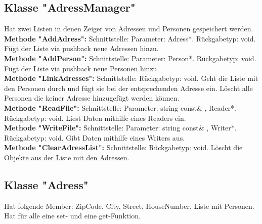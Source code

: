 \documentclass[12pt,a4paper]{article}
\begin{document}
\subsection {Klasse "AdressManager"}
Hat zwei Listen in denen Zeiger von Adressen und Personen gespeichert werden.
 \\

\textbf {Methode "AddAdress": } 
\newline
Schnittstelle: Parameter: Adress*. Rückgabetyp: void.
\newline 
Fügt der Liste via pushback neue Adressen hinzu.\\

\textbf {Methode "AddPerson": } 
\newline
Schnittstelle: Parameter: Person*. Rückgabetyp: void.
\newline
Fügt der Liste via pushback neue Personen hinzu. \\

\textbf {Methode "LinkAdresses": } 
\newline
Schnittstelle: Rückgabetyp: void.
\newline
 Geht die Liste mit den Personen durch und fügt sie bei der entsprechenden Adresse ein. Löscht alle Personen die keiner Adresse hinzugefügt werden können. \\

\textbf {Methode "ReadFile": } 
\newline
Schnittstelle: Parameter: string const\& , Reader*. Rückgabetyp: void.
\newline
Liest Daten mithilfe eines Readers ein.
\\

\textbf {Methode "WriteFile": } 
\newline
Schnittstelle: Parameter: string const\& , Writer*. Rückgabetyp: void.
\newline
Gibt Daten mithilfe eines Writers aus.
\\

\textbf {Methode "ClearAdressList": } 
\newline
Schnittstelle: Rückgabetyp: void.
\newline 
Löscht die Objekte aus der Liste mit den Adressen.\\


\subsection {Klasse "Adress"}
Hat folgende Member: ZipCode, City, Street, HouseNumber, Liste mit Personen. Hat für alle eine set- und eine get-Funktion.\\
\end{document}
